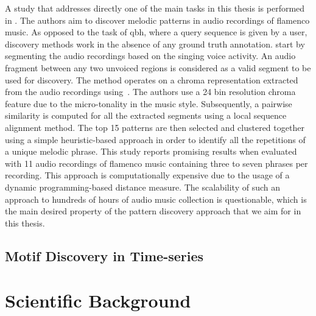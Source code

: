 A study that addresses directly one of the main tasks in this thesis is performed in \cite{kroher2015discovery}. The authors aim to discover melodic patterns in audio recordings of flamenco music. As opposed to the task of \gls{qbh}, where a query sequence is given by a user, discovery methods work in the absence of any ground truth annotation. \cite{kroher2015discovery} start by segmenting the audio recordings based on the singing voice activity. An audio fragment between any two unvoiced regions is considered as a valid segment to be used for discovery. The method operates on a chroma representation extracted from the audio recordings using~\citep{bartsch2005audio}. The authors use a 24 bin resolution chroma feature due to the micro-tonality in the music style. Subsequently, a pairwise similarity is computed for all the extracted segments using a local sequence alignment method. The top 15 patterns are then selected and clustered together using a simple heuristic-based approach in order to identify all the repetitions of a unique melodic phrase. This study reports promising results when evaluated with 11 audio recordings of flamenco music containing three to seven phrases per recording. This approach is computationally expensive due to the usage of a dynamic programming-based distance measure. The scalability of such an approach to hundreds of hours of audio music collection is questionable, which is the main desired property of the pattern discovery approach that we aim for in this thesis. 



\subsection{Motif Discovery in Time-series }






%
\section{Scientific Background}
\label{sec:background_scientific_background}

